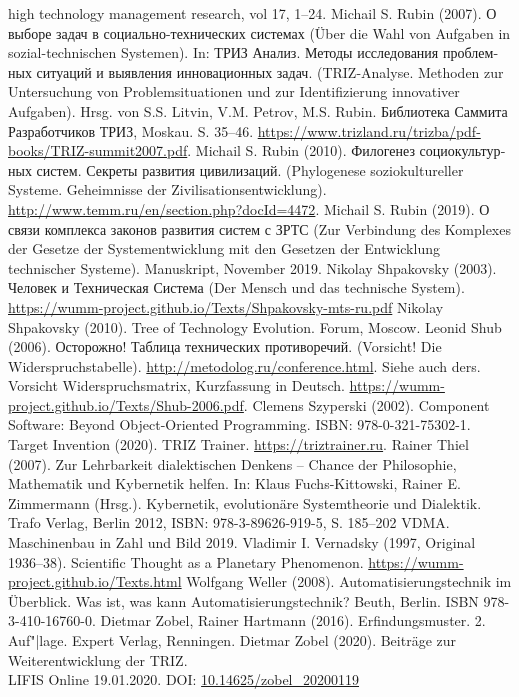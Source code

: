 \documentclass[11pt,a4paper]{article}
\begin{document}
\begin{thebibliography}{xxx}
  high technology management research, vol 17, 1--24.
 Michail S. Rubin (2007). \foreignlanguage{russian}{О
  выборе задач в социально-технических системах} (Über die Wahl von Aufgaben
  in sozial-technischen Systemen). In: \foreignlanguage{russian}{ТРИЗ Анализ.
    Методы исследования проблемных ситуаций и выявления инновационных задач}.
  (TRIZ-Analyse. Methoden zur Untersuchung von Problemsituationen und zur
  Identifizierung innovativer Aufgaben). Hrsg. von S.S. Litvin, V.M. Petrov,
  M.S. Rubin. \foreignlanguage{russian}{Библиотека Саммита Разработчиков
    ТРИЗ}, Moskau. S. 35--46.
  \url{https://www.trizland.ru/trizba/pdf-books/TRIZ-summit2007.pdf}.
 Michail S. Rubin (2010).
  \foreignlanguage{russian}{Филогенез социокультурных систем. Секреты развития
    цивилизаций}.  (Phylogenese soziokultureller Systeme. Geheimnisse der
  Zivilisationsentwicklung).
  \url{http://www.temm.ru/en/section.php?docId=4472}.
 Michail S. Rubin (2019).  \foreignlanguage{russian}{О
  связи комплекса законов развития систем с ЗРТС} (Zur Verbindung des
  Komplexes der Gesetze der Systementwicklung mit den Gesetzen der Entwicklung
  technischer Systeme). Manuskript, November 2019.
 Nikolay Shpakovsky (2003).
  \foreignlanguage{russian}{Человек и Техническая Система} (Der Mensch und das
  technische System).
  \url{https://wumm-project.github.io/Texts/Shpakovsky-mts-ru.pdf}
 Nikolay Shpakovsky (2010).  Tree of Technology
  Еvolution. Forum, Moscow.
 Leonid Shub (2006). \foreignlanguage{russian}{Осторожно!
  Таблица технических противоречий}. (Vorsicht! Die Widerspruchstabelle).
  \url{http://metodolog.ru/conference.html}. Siehe auch ders. Vorsicht
  Widerspruchsmatrix, Kurzfassung in Deutsch.
  \url{https://wumm-project.github.io/Texts/Shub-2006.pdf}.
 Clemens Szyperski (2002). Component Software: Beyond
  Object-Oriented Programming. ISBN: 978-0-321-75302-1.
 Target Invention (2020). TRIZ Trainer.
  \url{https://triztrainer.ru}.
 Rainer Thiel (2007). Zur Lehrbarkeit dialektischen Denkens
  – Chance der Philosophie, Mathematik und Kybernetik helfen. In: Klaus
  Fuchs-Kittowski, Rainer E. Zimmermann (Hrsg.). Kybernetik, evolutionäre
  Systemtheorie und Dialektik. Trafo Verlag, Berlin 2012, ISBN:
  978-3-89626-919-5, S. 185--202
 VDMA. Maschinenbau in Zahl und Bild 2019. 
 Vladimir I. Vernadsky (1997, Original 1936--38).
  Scientific Thought as a Planetary Phenomenon.
  \url{https://wumm-project.github.io/Texts.html}
 Wolfgang Weller (2008). Automatisierungstechnik im
  Überblick. Was ist, was kann Automatisierungstechnik? Beuth, Berlin. ISBN
  978-3-410-16760-0.
 Dietmar Zobel, Rainer Hartmann (2016). Erfindungsmuster.
  2. Auf"|lage.  Expert Verlag, Renningen.
 Dietmar Zobel (2020). Beiträge zur Weiterentwicklung der
  TRIZ.\\  LIFIS Online 19.01.2020. DOI: \url{10.14625/zobel_20200119}
\end{thebibliography}
\end{document}
